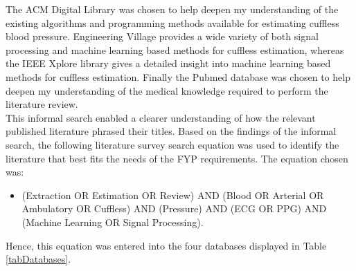 \begin{table}[H]
    \centering
    \caption{Official online databases used to conduct the literature review \cite{databasesImperial}}
    \label{tabDatabases}
\end{table}\noindent The ACM Digital Library was chosen to help deepen my understanding of the existing algorithms and programming methods available for estimating 
cuffless blood pressure. Engineering Village provides a wide variety of both signal processing and machine learning based methods for cuffless estimation, whereas the IEEE Xplore 
library gives a detailed insight into machine learning based methods for cuffless estimation. Finally the Pubmed database was chosen to help deepen my understanding of the medical knowledge 
required to perform the literature review.\\ \newline \noindent This informal search enabled a clearer understanding of how the relevant published literature phrased their titles. Based on the findings of the informal search, the following 
literature survey search equation was used to identify the literature that best fits the needs of the FYP requirements. The equation chosen was: 

\begin{itemize}
        \item (Extraction OR Estimation OR Review) AND (Blood OR Arterial OR Ambulatory OR Cuffless) AND (Pressure) AND (ECG OR PPG) AND (Machine Learning OR Signal Processing).
\end{itemize}\noindent Hence, this equation was entered into the four databases displayed in Table \ref{tabDatabases}.


